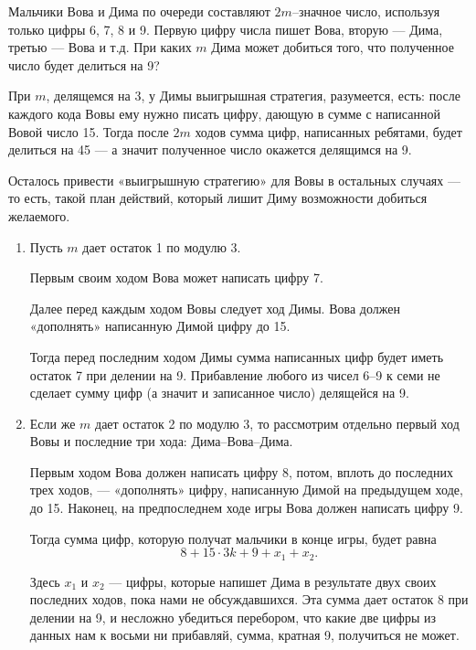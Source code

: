 \begin{itemize}

	\itC Мальчики Вова и Дима по очереди составляют $2m$--значное число, используя только цифры 6, 7, 8 и 9. Первую цифру числа пишет Вова, вторую — Дима, третью — Вова и т.д. При каких $m$ Дима может добиться того, что полученное число будет делиться на 9?
	
	\itr При $m$, делящемся на 3, у Димы выигрышная стратегия, разумеется, есть: после каждого кода Вовы ему нужно писать цифру, дающую в сумме с написанной Вовой число 15. Тогда после $2m$ ходов сумма цифр, написанных ребятами, будет делиться на 45 — а значит полученное число окажется делящимся на 9.
	
	Осталось привести «выигрышную стратегию» для Вовы в остальных случаях — то есть, такой план действий, который лишит Диму возможности добиться желаемого.
	
	\begin{enumerate}[label=\arabic*.]
	
	\item Пусть $m$ дает остаток 1 по модулю 3.
	
	Первым своим ходом Вова может написать цифру 7.
	
	Далее перед каждым ходом Вовы следует ход Димы. Вова должен «дополнять» написанную Димой цифру до 15.
	
	Тогда перед последним ходом Димы сумма написанных цифр будет иметь остаток 7 при делении на 9. Прибавление любого из чисел 6–9 к семи не сделает сумму цифр (а значит и записанное число) делящейся на 9.
	
	\item Если же $m$ дает остаток 2 по модулю 3, то рассмотрим отдельно первый ход Вовы и последние три хода: Дима–Вова–Дима.
	
	Первым ходом Вова должен написать цифру 8, потом, вплоть до последних трех ходов, — «дополнять» цифру, написанную Димой на предыдущем ходе, до 15. Наконец, на предпоследнем ходе игры Вова должен написать цифру 9.
	
	Тогда сумма цифр, которую получат мальчики в конце игры, будет равна
	$$8 + 15 \cdot 3k + 9 + x_1 + x_2.$$
	
	Здесь $x_1$ и $x_2$ — цифры, которые напишет Дима в результате двух своих последних ходов, пока нами не обсуждавшихся. Эта сумма дает остаток 8 при делении на 9, и несложно убедиться перебором, что какие две цифры из данных нам к восьми ни прибавляй, сумма, кратная 9, получиться не может. 
	
	\end{enumerate}

\end{itemize}

